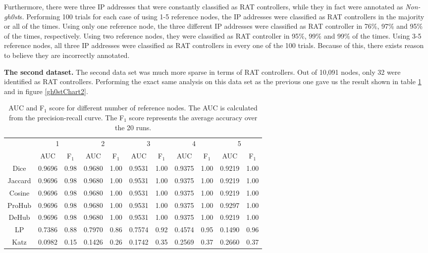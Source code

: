 Furthermore, there were three IP addresses that were constantly classified as RAT controllers, while they in fact were annotated as \textit{Non-gh0st}s. Performing 100 trials for each case of using 1-5 reference nodes, the IP addresses were classified as RAT controllers in the majority or all of the times. Using only one reference node, the three different IP addresses were classified as RAT controller in 76\%, 97\% and 95\% of the times, respectively. Using two reference nodes, they were classified as RAT controller in 95\%, 99\% and 99\% of the times. Using 3-5 reference nodes, all three IP addresses were classified as RAT controllers in every one of the 100 trials. Because of this, there exists reason to believe they are incorrectly annotated. 

\textbf{The second dataset.} The second data set was much more sparse in terms of RAT controllers. Out of 10,091 nodes, only 32 were identified as RAT controllers. Performing the exact same analysis on this data set as the previous one gave us the result shown in table \ref{aucIndex2} and in figure \ref{gh0stChart2}.

\begin{table}[h!]
    \centering
    \caption{AUC and F$_1$ score for different number of reference nodes. The AUC is calculated from the precision-recall curve. The F$_1$ score represents the average accuracy over the 20 runs.}
    \begin{tabular}{|c||c|c||c|c||c|c||c|c||c|c|}
      \hline
      \multirow{2}{*}{~} 
            & \multicolumn{2}{c||}{1}
            & \multicolumn{2}{c||}{2}
            & \multicolumn{2}{c||}{3}
            & \multicolumn{2}{c||}{4}
            & \multicolumn{2}{|c|}{5} \\             \cline{2-11}
      ~     &AUC&F$_1$&AUC&F$_1$&AUC&F$_1$&AUC&F$_1$&AUC&F$_1$ \\ \hline
    Dice    & 0.9696 & 0.98 & 0.9680 & 1.00 & 0.9531 & 1.00 & 0.9375 & 1.00 & 0.9219 & 1.00 \\
    Jaccard & 0.9696 & 0.98 & 0.9680 & 1.00 & 0.9531 & 1.00 & 0.9375 & 1.00 & 0.9219 & 1.00 \\
    Cosine  & 0.9696 & 0.98 & 0.9680 & 1.00 & 0.9531 & 1.00 & 0.9375 & 1.00 & 0.9219 & 1.00 \\
    ProHub  & 0.9696 & 0.98 & 0.9680 & 1.00 & 0.9531 & 1.00 & 0.9375 & 1.00 & 0.9297 & 1.00 \\
    DeHub   & 0.9696 & 0.98 & 0.9680 & 1.00 & 0.9531 & 1.00 & 0.9375 & 1.00 & 0.9219 & 1.00 \\ 
    LP      & 0.7386 & 0.88 & 0.7970 & 0.86 & 0.7574 & 0.92 & 0.4574 & 0.95 & 0.1490 & 0.96 \\
    Katz    & 0.0982 & 0.15 & 0.1426 & 0.26 & 0.1742 & 0.35 & 0.2569 & 0.37 & 0.2660 & 0.37 \\ \hline
    \end{tabular}
    \label{aucIndex2}
\end{table}

